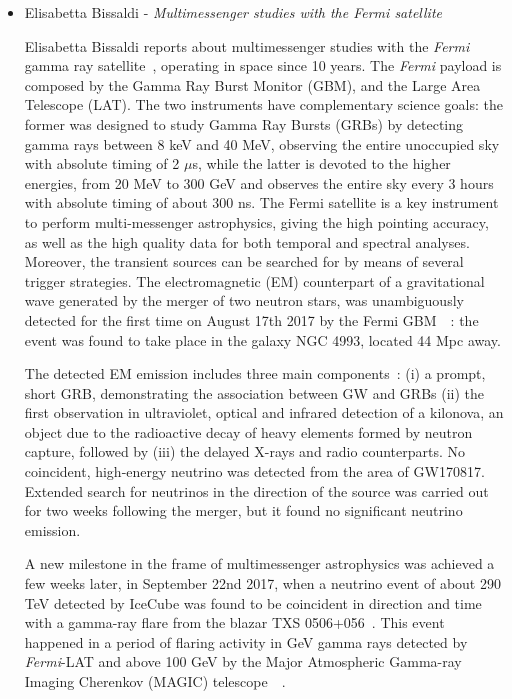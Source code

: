 \documentclass{PoS}
\begin{document}
\begin{itemize}
\item Elisabetta Bissaldi - {\it Multimessenger studies with the Fermi satellite}

Elisabetta Bissaldi reports about multimessenger studies with the \textit{Fermi} gamma ray satellite~\cite{Bissaldi}, operating in space since 10 years. The \textit{Fermi} payload is composed by the Gamma Ray Burst Monitor (GBM),  and the  Large Area Telescope (LAT). The two instruments have complementary science goals: the former was designed to study Gamma Ray Bursts (GRBs) by detecting gamma 
rays between 8 keV and 40 MeV, observing the entire unoccupied sky with absolute timing of 2 $\mu$s, while  the latter is devoted to the higher energies, from 20 MeV to 300 GeV and observes the entire sky every 3 hours with absolute timing of about 300  ns. 
The Fermi satellite is a key instrument to perform multi-messenger astrophysics, giving the high pointing accuracy, as well as the high quality data for both temporal and spectral analyses.  Moreover, the transient sources can be searched for by means of several trigger strategies.
The  electromagnetic (EM) counterpart of a gravitational wave generated by the merger of two neutron stars, was unambiguously detected for the first time on August 17th 2017 by the Fermi GBM~\cite{Gold2017}~\cite{Abbott2017}: the event was found to take place in the galaxy NGC 4993, located 44 Mpc away. %
 

The detected EM emission includes three main components~\cite{TheMMpaper}: (i) a prompt, short GRB, demonstrating the association between GW and GRBs (ii) the first observation in ultraviolet, optical and infrared detection of a  kilonova, an object  due to the radioactive decay of heavy elements formed by neutron capture, followed by (iii) the delayed X-rays and radio counterparts. 
No coincident, high-energy neutrino was detected  from the area of GW170817. Extended search for neutrinos in the direction of the source was carried out for two weeks following the merger, but it found no significant neutrino emission. 

A new milestone in the frame of multimessenger astrophysics was achieved a few weeks later, in September 22nd 2017, when a  neutrino event of about 290 TeV detected by IceCube was found to be coincident in direction and time with a gamma-ray flare from the blazar TXS 0506+056~\cite{IceCube:2018dnn}.  This event happened in a period of flaring activity in GeV gamma rays detected by \textit{Fermi}-LAT and 
 above 100 GeV by the Major Atmospheric Gamma-ray Imaging Cherenkov (MAGIC) telescope~\cite{IceCube:2018cha}~\cite{MAGIC}. 


\end{itemize}
\end{document}
